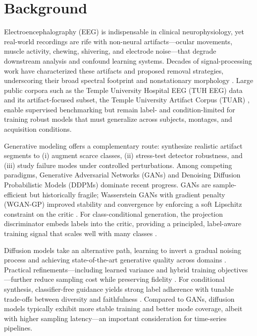 \documentclass{article}
\begin{document}

\section{Background}

Electroencephalography (EEG) is indispensable in clinical neurophysiology, yet real-world recordings are rife with non-neural artifacts—ocular movements, muscle activity, chewing, shivering, and electrode noise—that degrade downstream analysis and confound learning systems. Decades of signal-processing work have characterized these artifacts and proposed removal strategies, underscoring their broad spectral footprint and nonstationary morphology \citep{uriguen2015eegartifact}. Large public corpora such as the Temple University Hospital EEG (TUH EEG) data \citep{obeid2016tuh} and its artifact-focused subset, the Temple University Artifact Corpus (TUAR) \citep{hamid2020tuar}, enable supervised benchmarking but remain label- and condition-limited for training robust models that must generalize across subjects, montages, and acquisition conditions.

Generative modeling offers a complementary route: synthesize realistic artifact segments to (i) augment scarce classes, (ii) stress-test detector robustness, and (iii) study failure modes under controlled perturbations. Among competing paradigms, Generative Adversarial Networks (GANs) and Denoising Diffusion Probabilistic Models (DDPMs) dominate recent progress. GANs are sample-efficient but historically fragile; Wasserstein GANs with gradient penalty (WGAN-GP) improved stability and convergence by enforcing a soft Lipschitz constraint on the critic \citep{gulrajani2017wgan}. For class-conditional generation, the projection discriminator embeds labels into the critic, providing a principled, label-aware training signal that scales well with many classes \citep{miyato2018cgan}. 

Diffusion models take an alternative path, learning to invert a gradual noising process and achieving state-of-the-art generative quality across domains \citep{ho2020denoisingprobabilistic}. Practical refinements—including learned variance and hybrid training objectives—further reduce sampling cost while preserving fidelity \citep{nichol2021improveddenoising}. For conditional synthesis, classifier-free guidance yields strong label adherence with tunable trade-offs between diversity and faithfulness \citep{ho2022classifierfree}. Compared to GANs, diffusion models typically exhibit more stable training and better mode coverage, albeit with higher sampling latency—an important consideration for time-series pipelines.
\end{document}
